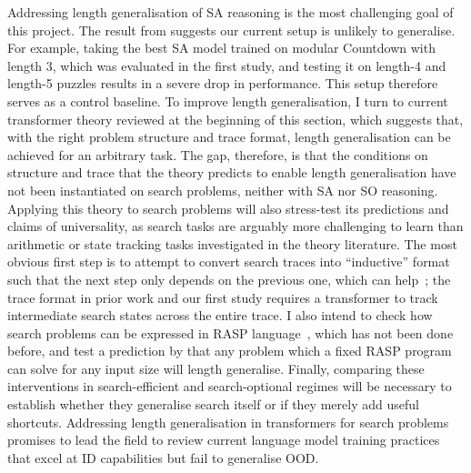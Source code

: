 Addressing length generalisation of SA reasoning is the most challenging goal of this project.
The result from \citep{caiExtrapolationAssociationLength2025} suggests our current setup is unlikely to generalise.
For example, taking the best SA model trained on modular Countdown with length 3, which was evaluated in the first study, and testing it on length-4 and length-5 puzzles results in a severe drop in performance.
This setup therefore serves as a control baseline.
To improve length generalisation, I turn to current transformer theory reviewed at the beginning of this section, which suggests that, with the right problem structure and trace format, length generalisation can be achieved for an arbitrary task.
The gap, therefore, is that the conditions on structure and trace that the theory predicts to enable length generalisation have not been instantiated on search problems, neither with SA nor SO reasoning.
Applying this theory to search problems will also stress-test its predictions and claims of universality, as search tasks are arguably more challenging to learn than arithmetic or state tracking tasks investigated in the theory literature.
The most obvious first step is to attempt to convert search traces into ``inductive'' format such that the next step only depends on the previous one, which can help~\citep{abbeHowFarCan2024,houUniversalLengthGeneralization2024}; the trace format in prior work and our first study requires a transformer to track intermediate search states across the entire trace.
I also intend to check how search problems can be expressed in RASP language~\citep{weissThinkingTransformers2021,zhouWhatAlgorithmsCan2023}, which has not been done before, and test a prediction by \citet{zhouWhatAlgorithmsCan2023} that any problem which a fixed RASP program can solve for any input size will length generalise.
Finally, comparing these interventions in search-efficient and search-optional regimes will be necessary to establish whether they generalise search itself or if they merely add useful shortcuts.
Addressing length generalisation in transformers for search problems promises to lead the field to review current language model training practices that excel at ID capabilities but fail to generalise OOD.
